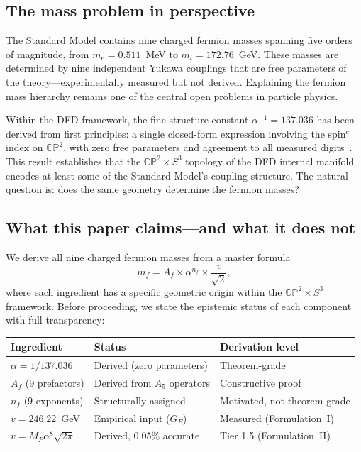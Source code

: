 \documentclass[11pt,a4paper]{article}
\newcommand{\CP}{\mathbb{CP}}
\theoremstyle{definition}
\theoremstyle{remark}
\begin{document}
\subsection{The mass problem in perspective}

The Standard Model contains nine charged fermion masses spanning five
orders of magnitude, from $m_e = 0.511$~MeV to $m_t = 172.76$~GeV.
These masses are determined by nine independent Yukawa couplings that
are free parameters of the theory---experimentally measured but not
derived.
Explaining the fermion mass hierarchy remains one of the central
open problems in particle physics.

Within the DFD framework, the fine-structure constant
$\alpha^{-1} = 137.036$ has been derived from first principles:
a single closed-form expression involving the spin$^c$ index on
$\CP^2$, with zero free parameters and agreement to all measured
digits~\cite{DFD_alpha}.
This result establishes that the $\CP^2\times S^3$ topology of the
DFD internal manifold encodes at least some of the Standard Model's
coupling structure.
The natural question is: does the same geometry determine the fermion
masses?

\subsection{What this paper claims---and what it does not}

We derive all nine charged fermion masses from a master formula
\begin{equation}\label{eq:master}
  m_f = A_f \times \alpha^{n_f} \times \frac{v}{\sqrt{2}},
\end{equation}
where each ingredient has a specific geometric origin within
the $\CP^2\times S^3$ framework.
Before proceeding, we state the epistemic status of each component
with full transparency:

\begin{center}
\renewcommand{\arraystretch}{1.25}
\begin{tabular}{lll}
\toprule
\textbf{Ingredient} & \textbf{Status} & \textbf{Derivation level} \\
\midrule
$\alpha = 1/137.036$ & Derived (zero parameters) & Theorem-grade \\
$A_f$ (9 prefactors) & Derived from $A_5$ operators & Constructive proof \\
$n_f$ (9 exponents) & Structurally assigned & Motivated, not theorem-grade \\
$v = 246.22$~GeV & Empirical input ($G_F$) & Measured (Formulation~I) \\
$v = M_P\alpha^8\sqrt{2\pi}$ & Derived, 0.05\% accurate & Tier 1.5 (Formulation~II) \\
\bottomrule
\end{tabular}
\end{center}
\end{document}
